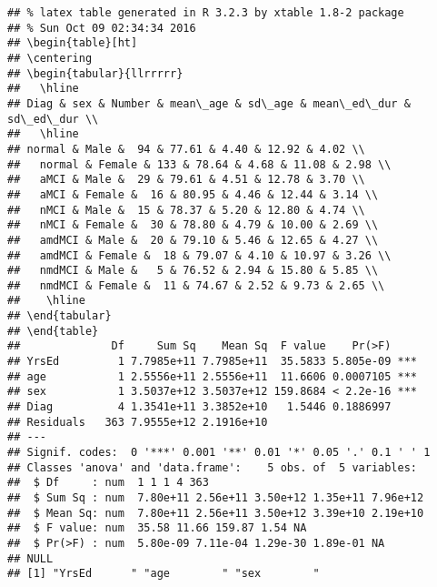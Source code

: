 \documentclass[12pt]{article}\usepackage[]{graphicx}\usepackage[]{color}
\makeatletter
\newenvironment{kframe}{%
 \def\at@end@of@kframe{}%
 \ifinner\ifhmode%
  \def\at@end@of@kframe{\end{minipage}}%
  \begin{minipage}{\columnwidth}%
 \fi\fi%
 \def\FrameCommand##1{\hskip\@totalleftmargin \hskip-\fboxsep
 \colorbox{shadecolor}{##1}\hskip-\fboxsep
     \hskip-\linewidth \hskip-\@totalleftmargin \hskip\columnwidth}%
 \MakeFramed {\advance\hsize-\width
   \@totalleftmargin\z@ \linewidth\hsize
   \@setminipage}}%
 {\par\unskip\endMakeFramed%
 \at@end@of@kframe}
\newenvironment{knitrout}{}{} %
\makeatother
\begin{document}
\begin{knitrout}
\color{fgcolor}\begin{kframe}
\begin{verbatim}
## % latex table generated in R 3.2.3 by xtable 1.8-2 package
## % Sun Oct 09 02:34:34 2016
## \begin{table}[ht]
## \centering
## \begin{tabular}{llrrrrr}
##   \hline
## Diag & sex & Number & mean\_age & sd\_age & mean\_ed\_dur & sd\_ed\_dur \\ 
##   \hline
## normal & Male &  94 & 77.61 & 4.40 & 12.92 & 4.02 \\ 
##   normal & Female & 133 & 78.64 & 4.68 & 11.08 & 2.98 \\ 
##   aMCI & Male &  29 & 79.61 & 4.51 & 12.78 & 3.70 \\ 
##   aMCI & Female &  16 & 80.95 & 4.46 & 12.44 & 3.14 \\ 
##   nMCI & Male &  15 & 78.37 & 5.20 & 12.80 & 4.74 \\ 
##   nMCI & Female &  30 & 78.80 & 4.79 & 10.00 & 2.69 \\ 
##   amdMCI & Male &  20 & 79.10 & 5.46 & 12.65 & 4.27 \\ 
##   amdMCI & Female &  18 & 79.07 & 4.10 & 10.97 & 3.26 \\ 
##   nmdMCI & Male &   5 & 76.52 & 2.94 & 15.80 & 5.85 \\ 
##   nmdMCI & Female &  11 & 74.67 & 2.52 & 9.73 & 2.65 \\ 
##    \hline
## \end{tabular}
## \end{table}
##              Df     Sum Sq    Mean Sq  F value    Pr(>F)    
## YrsEd         1 7.7985e+11 7.7985e+11  35.5833 5.805e-09 ***
## age           1 2.5556e+11 2.5556e+11  11.6606 0.0007105 ***
## sex           1 3.5037e+12 3.5037e+12 159.8684 < 2.2e-16 ***
## Diag          4 1.3541e+11 3.3852e+10   1.5446 0.1886997    
## Residuals   363 7.9555e+12 2.1916e+10                       
## ---
## Signif. codes:  0 '***' 0.001 '**' 0.01 '*' 0.05 '.' 0.1 ' ' 1
## Classes 'anova' and 'data.frame':	5 obs. of  5 variables:
##  $ Df     : num  1 1 1 4 363
##  $ Sum Sq : num  7.80e+11 2.56e+11 3.50e+12 1.35e+11 7.96e+12
##  $ Mean Sq: num  7.80e+11 2.56e+11 3.50e+12 3.39e+10 2.19e+10
##  $ F value: num  35.58 11.66 159.87 1.54 NA
##  $ Pr(>F) : num  5.80e-09 7.11e-04 1.29e-30 1.89e-01 NA
## NULL
## [1] "YrsEd      " "age        " "sex        "
\end{verbatim}
\end{kframe}
\end{knitrout}
\end{document}

